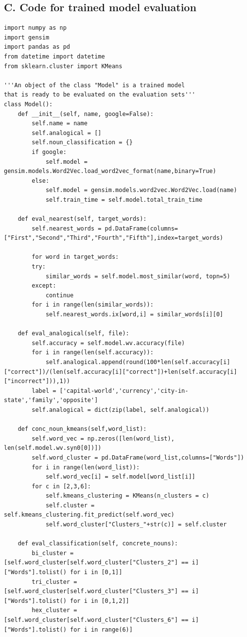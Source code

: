 \documentclass[12pt]{report}
\begin{document}
\newpage
\subsection*{C. Code for trained model evaluation}
\begin{lstlisting}
import numpy as np
import gensim
import pandas as pd
from datetime import datetime
from sklearn.cluster import KMeans

'''An object of the class "Model" is a trained model
that is ready to be evaluated on the evaluation sets'''
class Model():
	def __init__(self, name, google=False):
		self.name = name
		self.analogical = []
		self.noun_classification = {}
		if google:
			self.model = gensim.models.Word2Vec.load_word2vec_format(name,binary=True)
		else:
			self.model = gensim.models.word2vec.Word2Vec.load(name)
			self.train_time = self.model.total_train_time

	def eval_nearest(self, target_words):
		self.nearest_words = pd.DataFrame(columns=["First","Second","Third","Fourth","Fifth"],index=target_words)

		for word in target_words:
		try:
			similar_words = self.model.most_similar(word, topn=5)
		except:
			continue
		for i in range(len(similar_words)):
			self.nearest_words.ix[word,i] = similar_words[i][0]

	def eval_analogical(self, file):
		self.accuracy = self.model.wv.accuracy(file)
		for i in range(len(self.accuracy)):
			self.analogical.append(round(100*len(self.accuracy[i]["correct"])/(len(self.accuracy[i]["correct"])+len(self.accuracy[i]["incorrect"])),1))
		label = ['capital-world','currency','city-in-state','family','opposite']
		self.analogical = dict(zip(label, self.analogical))

	def conc_noun_kmeans(self,word_list):
		self.word_vec = np.zeros([len(word_list), len(self.model.wv.syn0[0])])
		self.word_cluster = pd.DataFrame(word_list,columns=["Words"])
		for i in range(len(word_list)):
			self.word_vec[i] = self.model[word_list[i]]
		for c in [2,3,6]: 
			self.kmeans_clustering = KMeans(n_clusters = c)
			self.cluster = self.kmeans_clustering.fit_predict(self.word_vec)
			self.word_cluster["Clusters_"+str(c)] = self.cluster

	def eval_classification(self, concrete_nouns):
		bi_cluster = [self.word_cluster[self.word_cluster["Clusters_2"] == i]["Words"].tolist() for i in [0,1]]
		tri_cluster = [self.word_cluster[self.word_cluster["Clusters_3"] == i]["Words"].tolist() for i in [0,1,2]]
		hex_cluster = [self.word_cluster[self.word_cluster["Clusters_6"] == i]["Words"].tolist() for i in range(6)]


\end{lstlisting}
\end{document}
